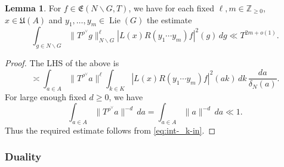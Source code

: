 \documentclass[reqno]{amsart}
\DeclareMathOperator{\Lie}{Lie}
\theoremstyle{plain} \newtheorem{theorem} {Theorem}
\theoremstyle{definition} \newtheorem{definition} [theorem] {Definition}
\theoremstyle{itplain} %
\newtheorem{lemma}[theorem]{Lemma}
\numberwithin{equation}{section}
\numberwithin{theorem}{section}
\renewcommand{\geq}{\geqslant}
\begin{document}
\begin{lemma}\label{lem:f-in-mathfraken-square-integral-frakE}
  For $f \in \mathfrak{E}(N \backslash G, T)$, we have for each fixed $\ell,m \in \mathbb{Z}_{\geq 0}$, $x \in \mathfrak{U}(A)$ and $y_1,\dotsc,y_m \in \Lie(G)$ the estimate
  \begin{equation*}
    \int _{g \in N \backslash G } \|T^{\rho^\vee} g\|_{N \backslash G}^{\ell}
    \left\lvert L(x) R(y_1 \dotsb y_m) f \right\rvert^2(g) \, d g
    \ll
    T^{2 m + o(1)}.
  \end{equation*}
\end{lemma}
\begin{proof}
  The LHS of the above is
  \begin{equation*}
    \asymp
    \int _{a \in A}
    \|T^{\rho^\vee} a\|^{\ell}
    \int _{k \in K}
    \left\lvert L(x) R(y_1 \dotsb y_m) f \right\rvert^2(a k)
    \, d k
    \, \frac{d a}{ \delta_N(a)}.
  \end{equation*}
  For large enough fixed $d \geq 0$, we have
  \begin{equation*}
    \int _{a \in A} \|T^{\rho^\vee} a\|^{-d} \, d a
    =
    \int _{a \in A} \|a\|^{-d} \, d a
    \ll 1.
  \end{equation*}
  Thus the required estimate follows from \eqref{eq:int-_k-in}.  
\end{proof}


\subsubsection{Duality}\label{sec:duality}
\end{document}
